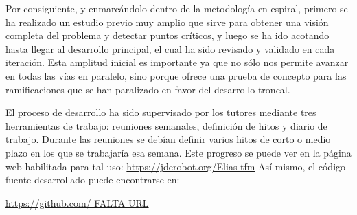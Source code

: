 Por consiguiente, y enmarcándolo dentro de la metodología en espiral, primero se ha realizado un estudio previo muy amplio que sirve para obtener una visión completa del problema y detectar puntos críticos, y luego se ha ido acotando hasta llegar al desarrollo principal, el cual ha sido revisado y validado en cada iteración. Esta amplitud inicial es importante ya que no sólo nos permite avanzar en todas las vías en paralelo, sino porque ofrece una prueba de concepto para las ramificaciones que se han paralizado en favor del desarrollo troncal.

El proceso de desarrollo ha sido supervisado por los tutores mediante tres herramientas de trabajo: reuniones semanales, definición de hitos y diario de trabajo.
Durante las reuniones se debían definir varios hitos de corto o medio plazo en los que se trabajaría esa semana. Este progreso se puede ver en la página web habilitada para tal uso:
\url{https://jderobot.org/Elias-tfm}
Así mismo, el código fuente desarrollado puede encontrarse en:

\url{https://github.com/ FALTA URL}

\clearpage

